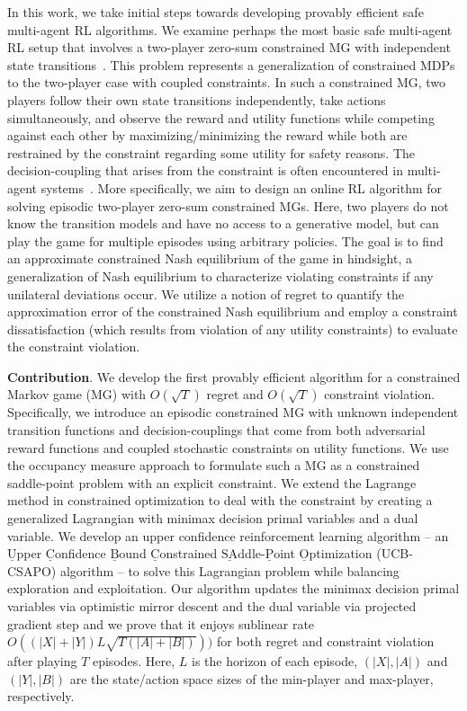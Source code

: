 \documentclass[12pt, final]{l4dc2023}
\begin{document}
In this work, we take initial steps towards developing provably efficient safe multi-agent RL algorithms. We examine perhaps the most basic safe multi-agent RL setup that involves a two-player zero-sum constrained MG with independent state transitions~\citep{altman2000constrained,altman2005zero,altman2008constrained,singh2014characterization}. 
This problem represents a generalization of constrained MDPs to the two-player case with coupled constraints. In such a constrained MG, two players follow their own state transitions independently, take actions simultaneously, and observe the reward and utility functions while competing against each other by maximizing/minimizing the reward while both are restrained by the constraint regarding some utility for safety reasons. The decision-coupling that arises from the constraint is often encountered in multi-agent systems~\citep{rosen1965existence,li2014decoupling,kulkarni2011generalized,kulkarni2017games,de2019resource}. More specifically, we aim to design an online RL algorithm for solving episodic two-player zero-sum constrained MGs. Here, two players do not know the transition models and have no access to a generative model, but can play the game for multiple episodes using arbitrary policies. The goal is to find an approximate constrained Nash equilibrium of the game in hindsight, a generalization of Nash equilibrium to characterize violating constraints if any unilateral deviations occur. We utilize a notion of regret to quantify the approximation error of the constrained Nash equilibrium and employ a constraint dissatisfaction (which results from violation of any utility constraints) to evaluate the constraint violation.

\vspace*{1ex}
\noindent\textbf{Contribution}. We develop the first provably efficient algorithm for a constrained Markov game (MG) with $O(\sqrt{T})$ regret and $O(\sqrt{T})$ constraint violation. Specifically, we introduce an episodic constrained MG with unknown independent transition functions and decision-couplings that come from both adversarial reward functions and coupled stochastic constraints on utility functions. We use the occupancy measure approach to formulate such a MG as a constrained saddle-point problem with an explicit constraint. 
We extend the Lagrange method in constrained optimization to deal with the constraint by creating a generalized Lagrangian with minimax decision primal variables and a dual variable.
We develop an upper confidence reinforcement learning algorithm -- an $\underline{\text{U}}$pper $\underline{\text{C}}$onfidence $\underline{\text{B}}$ound 
$\underline{\text{C}}$onstrained $\underline{\text{SA}}$ddle-$\underline{\text{P}}$oint $\underline{\text{O}}$ptimization (UCB-CSAPO) algorithm -- to solve this Lagrangian problem while balancing exploration and exploitation. Our algorithm updates the minimax decision primal variables via optimistic mirror descent and the dual variable via projected gradient step and we prove that it enjoys sublinear rate $ O((|X|+|Y|) L \sqrt{T(|A|+|B|)}))$ for both regret and constraint violation after playing $T$ episodes. Here, $L$ is the horizon of each episode, $(|X|,|A|)$ and $(|Y|,|B|)$ are the state/action space sizes of the min-player and max-player, respectively. 
\end{document}
